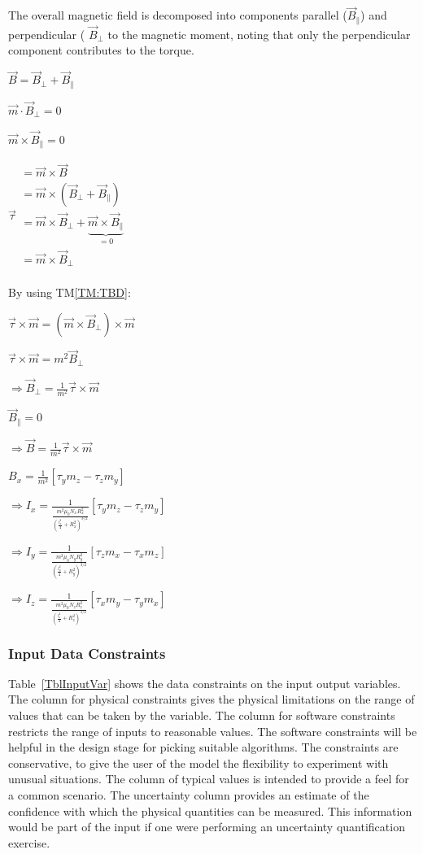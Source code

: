 \documentclass[12pt]{article}
\newcommand{\tref}[1]{TM\ref{#1}}
\begin{document}
The overall magnetic field is decomposed into components parallel ($\vec{B}_{\parallel}$) and perpendicular ( $\vec{B}_{\bot}$ to the magnetic moment, noting that only the perpendicular component contributes to the torque. 

$\vec{B}=\vec{B}_{\bot}+\vec{B}_{\parallel}$

$\vec{m}\cdot \vec{B}_{\bot}=0$

$\vec{m}\times \vec{B}_{\parallel}=0$

$\vec{\tau}\begin{array}{l}
 =\vec{m}\times \vec{B}\\
 =\vec{m}\times \left( \vec{B}_{\bot}+\vec{B}_{\parallel} \right)\\
 =\vec{m}\times \vec{B}_{\bot}+\underset{=0}{\underbrace{\vec{m}\times \vec{B}_{\parallel}}}\\
 =\vec{m}\times \vec{B}_{\bot}\\
\end{array}$

By using \tref{TM:TBD}:

$\vec{\tau}\times \vec{m}=\left( \vec{m}\times \vec{B}_{\bot} \right) \times \vec{m}$

$\vec{\tau}\times \vec{m}=m^2\vec{B}_{\bot}$

$\Rightarrow \vec{B}_{\bot}=\frac{1}{m^2}\vec{\tau}\times \vec{m}$

$\vec{B}_{\parallel}=0$

$\Rightarrow \vec{B}=\frac{1}{m^2}\vec{\tau}\times \vec{m}$

$B_x=\frac{1}{m^2}\left[ \tau _ym_z-\tau _zm_y \right] $

$\Rightarrow I_x=\frac{1}{\frac{m^2\mu _0N_xR_{x}^{2}}{\left( \frac{l_{x}^{2}}{4}+R_{x}^{2} \right) ^{3/2}}}\left[ \tau _ym_z-\tau _zm_y \right] $

$\Rightarrow I_y=\frac{1}{\frac{m^2\mu _0N_yR_{y}^{2}}{\left( \frac{l_{y}^{2}}{4}+R_{y}^{2} \right) ^{3/2}}}\left[ \tau _zm_x-\tau _xm_z \right] $

$\Rightarrow I_z=\frac{1}{\frac{m^2\mu _0N_zR_{z}^{2}}{\left( \frac{l_{z}^{2}}{4}+R_{z}^{2} \right) ^{3/2}}}\left[ \tau _xm_y-\tau _ym_x \right] $


\subsubsection{Input Data Constraints} \label{sec_DataConstraints}    

Table~\ref{TblInputVar} shows the data constraints on the input output
variables.  The column for physical constraints gives the physical limitations
on the range of values that can be taken by the variable.  The column for
software constraints restricts the range of inputs to reasonable values.  The
software constraints will be helpful in the design stage for picking suitable
algorithms.  The constraints are conservative, to give the user of the model the
flexibility to experiment with unusual situations.  The column of typical values
is intended to provide a feel for a common scenario.  The uncertainty column
provides an estimate of the confidence with which the physical quantities can be
measured.  This information would be part of the input if one were performing an
uncertainty quantification exercise.
\end{document}
